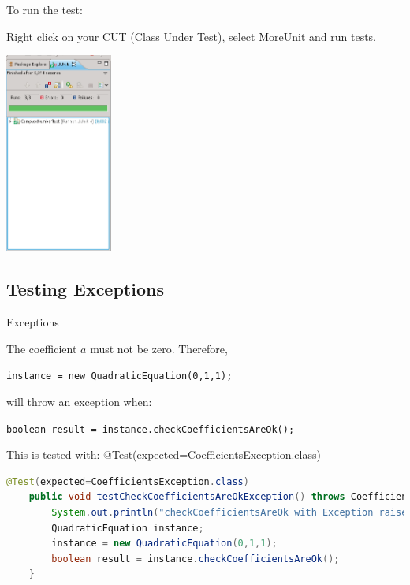 \documentclass[11pt, xcolor=svgnames]{beamer}
\begin{document}

\begin{frame}

To run the test: 

Right click on your CUT (Class Under Test), select MoreUnit and run tests.

\begin{center}
\includegraphics[width=100pt]{./figs/Results}
\end{center}

\end{frame}


\subsection{Testing Exceptions}



\begin{frame}[fragile]{Exceptions}

The coefficient $a$ must not be zero. Therefore,

\texttt{instance = new QuadraticEquation(0,1,1);}

will throw an exception when:

\texttt{boolean result = instance.checkCoefficientsAreOk();}

This is tested with:
    @Test(expected=CoefficientsException.class)

\begin{lstlisting}[language=JAVA,basicstyle=\scriptsize]
    @Test(expected=CoefficientsException.class)
    public void testCheckCoefficientsAreOkException() throws CoefficientsException {
        System.out.println("checkCoefficientsAreOk with Exception raised");
        QuadraticEquation instance;
        instance = new QuadraticEquation(0,1,1);
        boolean result = instance.checkCoefficientsAreOk();
    }
\end{lstlisting}

\end{frame}
\end{document}

